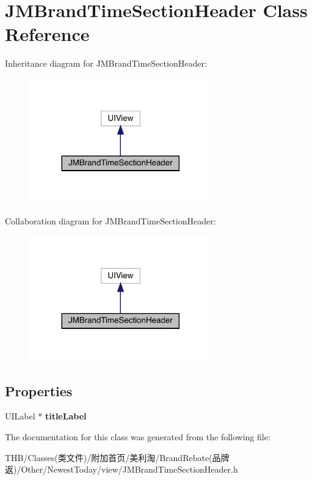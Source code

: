 \hypertarget{interface_j_m_brand_time_section_header}{}\section{J\+M\+Brand\+Time\+Section\+Header Class Reference}
\label{interface_j_m_brand_time_section_header}


Inheritance diagram for J\+M\+Brand\+Time\+Section\+Header\+:\nopagebreak
\begin{figure}[H]
\begin{center}
\leavevmode
\includegraphics[width=224pt]{interface_j_m_brand_time_section_header__inherit__graph}
\end{center}
\end{figure}


Collaboration diagram for J\+M\+Brand\+Time\+Section\+Header\+:\nopagebreak
\begin{figure}[H]
\begin{center}
\leavevmode
\includegraphics[width=224pt]{interface_j_m_brand_time_section_header__coll__graph}
\end{center}
\end{figure}
\subsection*{Properties}
\begin{DoxyCompactItemize}
\item 
\mbox{\label{interface_j_m_brand_time_section_header_aa45f7310f2aa3fe70417eab07616d81d}} 
U\+I\+Label $\ast$ {\bfseries title\+Label}
\end{DoxyCompactItemize}


The documentation for this class was generated from the following file\+:\begin{DoxyCompactItemize}
\item 
T\+H\+B/\+Classes(类文件)/附加首页/美利淘/\+Brand\+Rebate(品牌返)/\+Other/\+Newest\+Today/view/J\+M\+Brand\+Time\+Section\+Header.\+h\end{DoxyCompactItemize}
